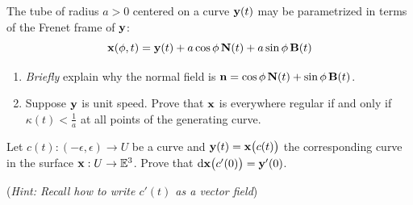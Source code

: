 \begin{exercises}
\begin{enumerate}
		
		\begin{minipage}[t]{0.75\linewidth}\vspace{-8pt}
			\item The tube of radius $a>0$ centered on a curve ${\mathbf{y}}(t)$ may be parametrized in terms of the Frenet frame of ${\mathbf{y}}$:
			\[
				{\mathbf{x}}(\phi,t)={\mathbf{y}}(t)+a\cos\phi\,{\mathbf{N}}(t)+a\sin\phi\,{\mathbf{B}}(t)
			\]
			\begin{enumerate}
			  \item \emph{Briefly} explain why the normal field is ${\mathbf{n}}=\cos\phi\,{\mathbf{N}}(t)+\sin\phi\,{\mathbf{B}}(t)$.
			  \item Suppose ${\mathbf{y}}$ is unit speed. Prove that ${\mathbf{x}}$ is everywhere regular if and only if $\kappa(t)<\frac 1a$ at all points of the generating curve.
			\end{enumerate}
		  
			\item\label{exs:tangentsurface} Let $c(t):(-\epsilon,\epsilon)\to U$ be a curve and ${\mathbf{y}}(t)={\mathbf{x}}\bigl(c(t)\bigr)$ the corresponding curve in the surface ${\mathbf{x}}:U\to\mathbb{E}^3$. Prove that $\mathrm{d}{\mathbf{x}}\bigl(c'(0)\bigr)={\mathbf{y}}'(0)$.\par
			(\emph{Hint: Recall how to write $c'(t)$ as a \emph{vector field}}) 
			

\end{minipage}
\end{enumerate}
\end{exercises}
